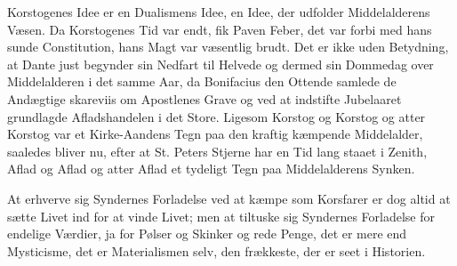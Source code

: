 \documentclass[12pt]{book}
\begin{document}
Korstogenes Idee er en Dualismens Idee, en Idee,
der udfolder Middelalderens Væsen. Da Korstogenes
Tid var endt, fik Paven Feber, det var forbi med hans
sunde Constitution, hans Magt var væsentlig brudt. Det
er ikke uden Betydning, at Dante just begynder sin Nedfart
til Helvede og dermed sin Dommedag over Middelalderen
i det samme Aar, da Bonifacius den Ottende
samlede de Andægtige skareviis om Apostlenes Grave
og ved at indstifte Jubelaaret grundlagde Afladshandelen
i det Store. Ligesom Korstog og Korstog og atter
Korstog var et Kirke-Aandens Tegn paa den kraftig
kæmpende Middelalder, saaledes bliver nu, efter at St.
Peters Stjerne har en Tid lang staaet i Zenith, Aflad og
Aflad og atter Aflad et tydeligt Tegn paa Middelalderens
Synken.

At erhverve sig Syndernes Forladelse ved at kæmpe
som Korsfarer er dog altid at sætte Livet ind for at
vinde Livet; men at tiltuske sig Syndernes Forladelse
for endelige Værdier, ja for Pølser og Skinker og rede
Penge, det er mere end Mysticisme, det er Materialismen
selv, den frækkeste, der er seet i Historien.
\end{document}
